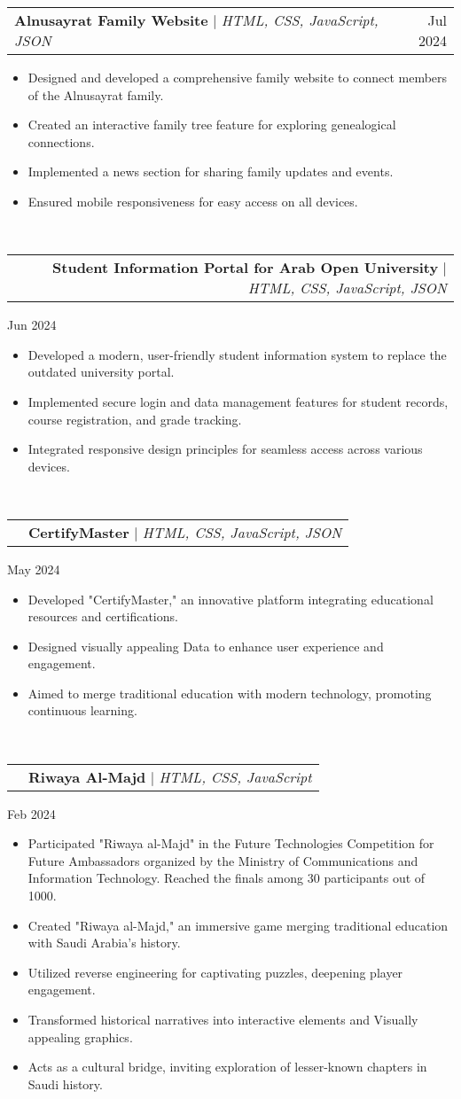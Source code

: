 \documentclass[letterpaper,11pt]{article}
\makeatletter
\newcommand{\resumeItem}[1]{
  \item\small{
    {#1 \vspace{-2pt}}
  }
}
\newcommand{\resumeProjectHeading}[2]{
    \item
    \begin{tabular*}{0.97\textwidth}{l@{\extracolsep{\fill}}r}
      \small#1 & #2 \\
    \end{tabular*}\vspace{-7pt}
}
\newcommand{\resumeItemListStart}{\begin{itemize}}
\newcommand{\resumeItemListEnd}{\end{itemize}\vspace{-5pt}}
\makeatother
\begin{document}
{{      
      \resumeProjectHeading
          {\textbf{Alnusayrat Family Website} $|$ \emph{HTML, CSS, JavaScript, JSON}}{Jul 2024}
          \resumeItemListStart
          \resumeItem{Designed and developed a comprehensive family website to connect members of the Alnusayrat family.}
            \resumeItem{Created an interactive family tree feature for exploring genealogical connections.}
            \resumeItem{Implemented a news section for sharing family updates and events.}
            \resumeItem{Ensured mobile responsiveness for easy access on all devices.}
          \resumeItemListEnd
          \hfill \
      \resumeProjectHeading


     \resumeProjectHeading
          {\textbf{Student Information Portal for Arab Open University} $|$ \emph{HTML, CSS, JavaScript, JSON}}{Jun 2024}
          \resumeItemListStart
          \resumeItem{Developed a modern, user-friendly student information system to replace the outdated university portal.}
            \resumeItem{Implemented secure login and data management features for student records, course registration, and grade tracking.}
            \resumeItem{Integrated responsive design principles for seamless access across various devices.}
          \resumeItemListEnd
          \hfill \
      \resumeProjectHeading

    
     \resumeProjectHeading
          {\textbf{CertifyMaster} $|$ \emph{HTML, CSS, JavaScript, JSON}}{May 2024}
          \resumeItemListStart
          \resumeItem{Developed "CertifyMaster," an innovative platform integrating educational resources and certifications.}
            \resumeItem{Designed visually appealing Data to enhance user experience and engagement.}
            \resumeItem{Aimed to merge traditional education with modern technology, promoting continuous learning.}
          \resumeItemListEnd
          \hfill \
      \resumeProjectHeading


     \resumeProjectHeading      
        {\textbf{Riwaya Al-Majd} $|$ \emph{HTML, CSS, JavaScript}}{Feb 2024}
          \resumeItemListStart
          \resumeItem{Participated "Riwaya al-Majd" in the Future Technologies Competition for Future Ambassadors organized by the Ministry of Communications and Information Technology. Reached the finals among 30 participants out of 1000.}
            \resumeItem{Created "Riwaya al-Majd," an immersive game merging traditional education with Saudi Arabia's history.}
            \resumeItem{Utilized reverse engineering for captivating puzzles, deepening player engagement.}
            \resumeItem{Transformed historical narratives into interactive elements and Visually appealing graphics.}
            \resumeItem{Acts as a cultural bridge, inviting exploration of lesser-known chapters in Saudi history.}
          \resumeItemListEnd
          \hfill \
      \resumeProjectHeading


}}
\end{document}
